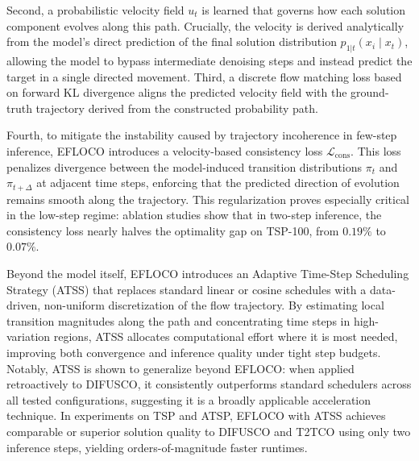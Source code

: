 Second, a probabilistic velocity field $u_t$ is learned that governs how each solution component evolves along this path. Crucially, the velocity is derived analytically from the model's direct
prediction of the final solution distribution $p_{1|t}(x_i \mid x_t)$, allowing
the model to bypass intermediate denoising steps and instead predict the target
in a single directed movement. Third, a discrete flow matching loss based on
forward KL divergence aligns the predicted velocity field with the ground-truth
trajectory derived from the constructed probability path.

Fourth, to mitigate the instability caused by trajectory incoherence in
few-step inference, EFLOCO introduces a velocity-based consistency loss
$\mathcal{L}_\text{cons}$. This loss penalizes divergence between the
model-induced transition distributions $\pi_t$ and $\pi_{t+\Delta}$ at adjacent
time steps, enforcing that the predicted direction of evolution remains smooth
along the trajectory. This regularization proves especially critical in the
low-step regime: ablation studies show that in two-step inference, the
consistency loss nearly halves the optimality gap on TSP-100, from $0.19\%$ to
$0.07\%$.

Beyond the model itself, EFLOCO introduces an Adaptive Time-Step Scheduling
Strategy (ATSS) that replaces standard linear or cosine schedules with a
data-driven, non-uniform discretization of the flow trajectory. By estimating
local transition magnitudes along the path and concentrating time steps in
high-variation regions, ATSS allocates computational effort where it is most
needed, improving both convergence and inference quality under tight step
budgets. Notably, ATSS is shown to generalize beyond EFLOCO: when applied
retroactively to DIFUSCO, it consistently outperforms standard schedulers
across all tested configurations, suggesting it is a broadly applicable
acceleration technique. In experiments on TSP and ATSP, EFLOCO with ATSS
achieves comparable or superior solution quality to DIFUSCO and T2TCO using
only two inference steps, yielding orders-of-magnitude faster runtimes.


